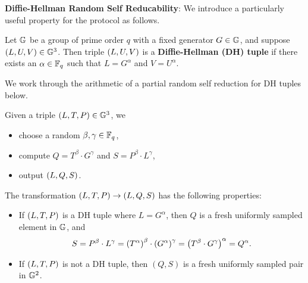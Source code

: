 \noindent \textbf{Diffie-Hellman Random Self Reducability}: We introduce a particularly useful property for the protocol as follows.
\begin{definition}
\label{def:dh_tup}
 Let $ \mathbb{G} $ be a group of prime order $q$ with a fixed generator $G \in \mathbb{G}$, and suppose $\left(L, U, V\right) \in \mathbb{G}^3$. Then triple $\left(L,U,V\right)$ is a \textbf{Diffie-Hellman (DH) tuple} if there exists an $\alpha \in \mathbb{F}_q$ such that $L = G^\alpha$ and $V = U^\alpha$.
 \end{definition} 
\noindent
We work through the arithmetic of a partial random self reduction for DH tuples below. 
\begin{definition}
Given a triple $\left(L, T, P\right) \in \mathbb{G}^3$, we
\begin{itemize}
	\item choose a random $\beta, \gamma \in \mathbb{F}_q$,
	\item compute $Q = T^\beta \cdot G^\gamma$ and $S = P^\beta \cdot L^\gamma$,
	\item output $\left(L,Q,S\right)$.
\end{itemize}
\end{definition}
\noindent
The transformation $\left(L, T, P\right) \to \left(L, Q, S\right)$ has the following properties:
\begin{itemize}
	\item If $\left(L, T, P\right)$ is a DH tuple where $L = G^\alpha$, then $Q$ is a fresh uniformly sampled element in $\mathbb{G}$, and 
	\begin{align*}
	S =  P^\beta \cdot L^\gamma = \left(T^\alpha\right)^\beta \cdot \left(G^\alpha\right)^\gamma =  \left(T^\beta \cdot G^\gamma\right)^\alpha = Q^\alpha.
	\end{align*}
	\item If $\left(L, T, P\right)$ is not a DH tuple, then  $(Q,S)$ is a fresh uniformly sampled pair in $\mathbb{G}^2$.
\end{itemize}

